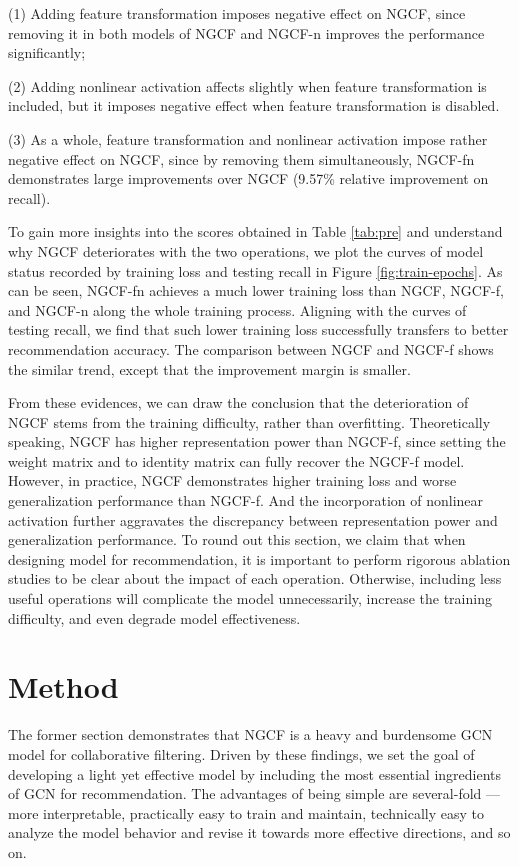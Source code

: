 \documentclass[sigconf]{acmart}
\theoremstyle{definition}
\begin{document}
(1) Adding feature transformation imposes negative effect on NGCF, since removing it in both models of NGCF and NGCF-n improves the performance significantly; 

(2) Adding nonlinear activation affects slightly when feature transformation is included, but it imposes negative effect when feature transformation is disabled. 

(3) As a whole, feature transformation and nonlinear activation impose rather negative effect on NGCF, since by removing them simultaneously, NGCF-fn demonstrates large improvements over NGCF (9.57\% relative improvement on recall). 

To gain more insights into the scores obtained in Table \ref{tab:pre} and understand why NGCF deteriorates with the two operations, we plot the curves of model status recorded by training loss and testing recall in Figure \ref{fig:train-epochs}. 
As can be seen, NGCF-fn achieves a much lower training loss than NGCF, NGCF-f, and NGCF-n along the whole training process. Aligning with the curves of testing recall, we find that such lower training loss successfully transfers to better recommendation accuracy.
The comparison between NGCF and NGCF-f shows the similar trend, except that the improvement margin is smaller. 

From these evidences, we can draw the conclusion that the deterioration of NGCF stems from the training difficulty, rather than overfitting. 
Theoretically speaking, NGCF has higher representation power than NGCF-f, since setting the weight matrix  and  to identity matrix  can fully recover the NGCF-f model. However, in practice, NGCF demonstrates higher training loss and worse generalization performance than NGCF-f. 
And the incorporation of nonlinear activation further aggravates the discrepancy between representation power and generalization performance. To round out this section, we claim that when designing model for recommendation, it is important to perform rigorous ablation studies to be clear about the impact of each operation. Otherwise, including less useful operations will complicate the model unnecessarily, increase the training difficulty, and even degrade model effectiveness.  \section{Method}\label{sec:method}
The former section demonstrates that NGCF is a heavy and burdensome GCN model for  collaborative filtering.
Driven by these findings, we set the goal of developing a light yet effective model by including the most essential ingredients of GCN for recommendation. 
The advantages of being simple are several-fold --- more interpretable, practically easy to train and maintain, technically easy to analyze the model behavior and revise it towards more effective directions, and so on. 
\end{document}
